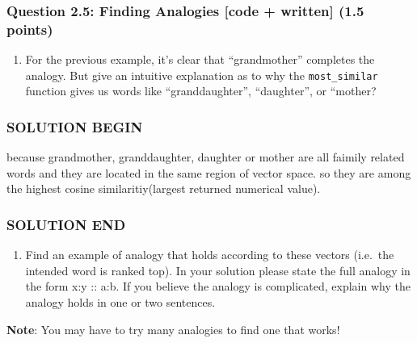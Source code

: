 \documentclass[11pt]{article}
\providecommand{\tightlist}{%
      \setlength{\itemsep}{0pt}\setlength{\parskip}{0pt}}
\begin{document}
    \subsubsection{Question 2.5: Finding Analogies {[}code + written{]} (1.5
points)}\label{question-2.5-finding-analogies-code-written-1.5-points}

\begin{enumerate}
\def\labelenumi{\alph{enumi}.}
\tightlist
\item
  For the previous example, it's clear that ``grandmother'' completes
  the analogy. But give an intuitive explanation as to why the
  \texttt{most\_similar} function gives us words like ``granddaughter'',
  ``daughter'', or ``mother?
\end{enumerate}

    \subsubsection{SOLUTION BEGIN}\label{solution-begin}

because grandmother, granddaughter, daughter or mother are all faimily
related words and they are located in the same region of vector space.
so they are among the highest cosine similaritiy(largest returned
numerical value).

\subsubsection{SOLUTION END}\label{solution-end}

    \begin{enumerate}
\def\labelenumi{\alph{enumi}.}
\setcounter{enumi}{1}
\tightlist
\item
  Find an example of analogy that holds according to these vectors
  (i.e.~the intended word is ranked top). In your solution please state
  the full analogy in the form x:y :: a:b. If you believe the analogy is
  complicated, explain why the analogy holds in one or two sentences.
\end{enumerate}

\textbf{Note}: You may have to try many analogies to find one that
works!
\end{document}
